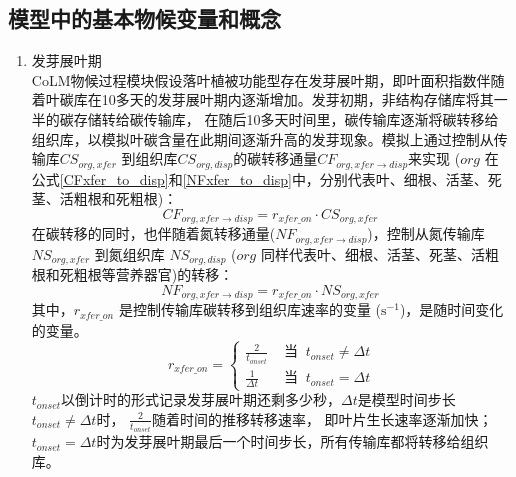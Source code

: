 \subsection{模型中的基本物候变量和概念}\label{模型中的基本物候变量和概念}

\begin{enumerate}
\renewcommand{\theenumi}{\alph{enumi}}
\item 发芽展叶期\\
CoLM物候过程模块假设落叶植被功能型存在发芽展叶期，即叶面积指数伴随着叶碳库在10多天的发芽展叶期内逐渐增加。发芽初期，非结构存储库将其一半的碳存储转给碳传输库，
在随后10多天时间里，碳传输库逐渐将碳转移给组织库，以模拟叶碳含量在此期间逐渐升高的发芽现象。模拟上通过控制从传输库$CS_{org,{xfer}}$
到组织库$CS_{org,disp}$的碳转移通量$CF_{org,{xfer}\rightarrow {disp}}$来实现
($org$ 在公式\eqref{CFxfer_to_disp}和\eqref{NFxfer_to_disp}中，分别代表叶、细根、活茎、死茎、活粗根和死粗根)：
\begin{equation}\label{CFxfer_to_disp}
  CF_{org,{xfer}\rightarrow disp} = r_{{xfer}\_{on}}\cdot CS_{org,{xfer}}\ 
\end{equation}
在碳转移的同时，也伴随着氮转移通量($NF_{org,{xfer}\rightarrow disp}$)，控制从氮传输库 $NS_{org,{xfer}}$ 到氮组织库 $NS_{org,disp}$ ($org$ 同样代表叶、细根、活茎、死茎、活粗根和死粗根等营养器官)的转移：
\begin{equation}\label{NFxfer_to_disp}
  NF_{org,{xfer}\rightarrow disp} = r_{{xfer}\_{on}}\cdot NS_{org,{xfer}}\ 
\end{equation}
其中，$r_{{xfer}\_{on}}$ 是控制传输库碳转移到组织库速率的变量 ($\mathrm{s^{-1}}$)，是随时间变化的变量。
\begin{equation}
r_{xfer\_{on}}=\begin{cases}
\frac{2}{t_{ {onset}}} &  \text{ 当 }\ t_{ {onset}} \neq \Delta t \\ 
\frac{1}{\Delta t} &  \text{ 当 }\ t_{onset}=\Delta t
\end{cases}
\end{equation}
$t_{onset}$以倒计时的形式记录发芽展叶期还剩多少秒，$\Delta t$是模型时间步长$t_{onset}\neq\Delta t$时，
$\frac{2}{t_{onset}}$随着时间的推移转移速率，
即叶片生长速率逐渐加快；$t_{onset}=\Delta t$时为发芽展叶期最后一个时间步长，所有传输库都将转移给组织库。


\end{enumerate}
